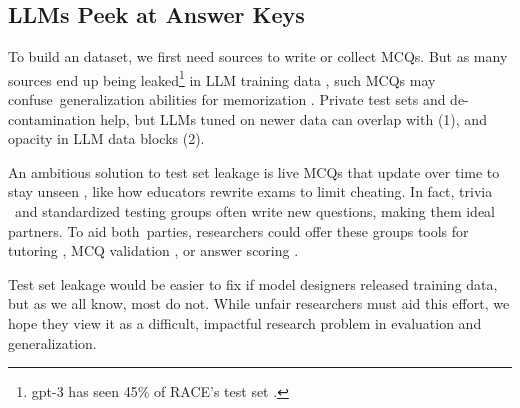 

\subsection{LLMs Peek at \mcqa Answer Keys} \label{subsection:test_set_leakage}

To build an \mcqa dataset, we first need sources to write or collect
MCQs.
%
But as many sources end up being leaked\footnote{gpt-3 has seen
45\% of RACE's test set \cite{sainz2023nlp}.} in LLM training data
\cite{magar2022data}, such MCQs may confuse~generalization abilities for
memorization \cite{lewis2020question}.
%
Private test sets \cite{sap2019socialiqa} and de-contamination
\cite{zhou2023don} help, but LLMs tuned on newer data can overlap with
(1), and opacity in LLM data \cite{soldaini2024dolma} blocks (2).

An ambitious solution to test set leakage is live MCQs that update over time to stay unseen \cite{white2024livebench}, like how educators rewrite exams to limit cheating.
In fact, trivia \cite{jennings2007brainiac}~and standardized testing groups often write new questions, making them ideal partners.
To aid both~parties, researchers could offer these groups tools for tutoring \cite{li-etal-2024-eden}, MCQ validation \cite{yu-etal-2024-automating-true}, or answer scoring \cite{yang-etal-2020-enhancing}.

Test set leakage would be easier to fix if model designers released
training data, but as we all know, most do not.
%
While unfair researchers must aid this effort, we hope they view it as
a difficult, impactful research problem in evaluation and
generalization.
